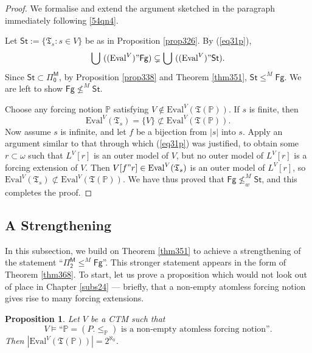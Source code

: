 \documentclass[12pt, twoside]{memoir}
\numberwithin{equation}{section}
\newtheorem{prop}[thm]{Proposition}
\theoremstyle{definition}
\theoremstyle{remark}
\theoremstyle{definition}
\theoremstyle{definition}
\theoremstyle{definition}
\theoremstyle{remark}
\begin{document}
\begin{proof}
We formalise and extend the argument sketched in the paragraph immediately following \ref{54qn4}. 

Let $\mathsf{St} := \{\mathfrak{T}_s : s \in V\}$ be as in Proposition \ref{prop326}. By (\ref{eq31p}), 
\begin{equation*}
    \bigcup \ ((\mathrm{Eval}^V)" \mathsf{Fg})  \subsetneq \bigcup \ ((\mathrm{Eval}^V)" \mathsf{St}) \text{.}
\end{equation*}
Since $\mathsf{St} \subset \mathsf{\Pi^M_0}$, by Proposition \ref{prop338} and Theorem \ref{thm351}, $\mathsf{St} \leq^M \mathsf{Fg}$. We are left to show $\mathsf{Fg} \not\leq^M \mathsf{St}$. 

Choose any forcing notion $\mathbb{P}$ satisfying $V \not\in \mathrm{Eval}^V(\mathfrak{T}(\mathbb{P}))$. If $s$ is finite, then $$\mathrm{Eval}^V(\mathfrak{T}_s) = \{V\} \not\subset \mathrm{Eval}^V(\mathfrak{T}(\mathbb{P})) \text{.}$$ Now assume $s$ is infinite, and let $f$ be a bijection from $|s|$ into $s$. Apply an argument similar to that through which (\ref{eq31p}) was justified, to obtain some $r \subset \omega$ such that $L^V[r]$ is an outer model of $V$, but no outer model of $L^V[r]$ is a forcing extension of $V$. Then $V[f" r] \in \mathrm{Eval}^V(\mathfrak{T}_s)$ is an outer model of $L^V[r]$, so $\mathrm{Eval}^V(\mathfrak{T}_s) \not\subset \mathrm{Eval}^V(\mathfrak{T}(\mathbb{P}))$. We have thus proved that $\mathsf{Fg} \not\leq^M_w \mathsf{St}$, and this completes the proof.
\end{proof}

\subsection{A Strengthening}

In this subsection, we build on Theorem \ref{thm351} to achieve a strengthening of the statement ``$\mathsf{\Pi^M_2} \leq^M \mathsf{Fg}$''. This stronger statement appears in the form of Theorem \ref{thm368}. To start, let us prove a proposition which would not look out of place in Chapter \ref{subs24} --- briefly, that a non-empty atomless forcing notion gives rise to many forcing extensions.

\begin{prop}\label{prop359}
Let $V$ be a CTM such that
\begin{equation*}
    V \models \text{``} \mathbb{P} = (P. \leq_{\mathbb{P}}) \text{ is a non-empty atomless forcing notion''.} 
\end{equation*}
Then $|\mathrm{Eval}^V(\mathfrak{T}(\mathbb{P}))| = 2^{\aleph_0}$.
\end{prop}
\end{document}
